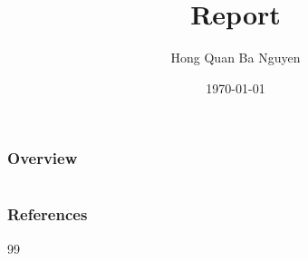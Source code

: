 \documentclass{beamer}
\title[Report]{Report} %
\author{Hong Quan Ba Nguyen} %
\institute[WIAS Berlin] %
{
    WIAS Berlin, Germany \\ %
    \medskip
    \texttt{hong.nguyen@wias-berlin.de} %
}
\date{\today} %
\begin{document}
\begin{frame}
    \titlepage %
\end{frame}

\begin{frame}
    \frametitle{Overview}
    \tableofcontents
\end{frame}


\section{}

\begin{frame}
    
\end{frame}


\begin{frame}
    \frametitle{References}
    \begin{thebibliography}{99}
        \bibitem[]{}
    \end{thebibliography}
\end{frame}

    
\end{document}
